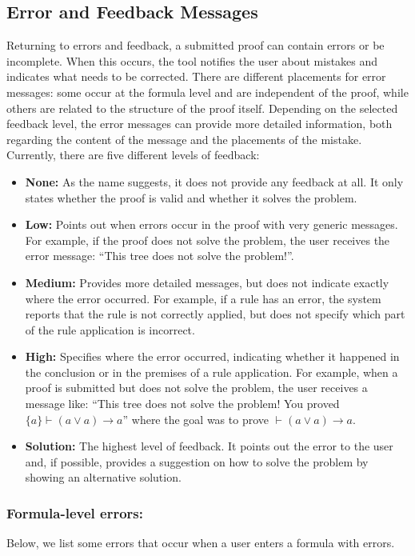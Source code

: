\subsection{Error and Feedback Messages}
Returning to errors and feedback, a submitted proof can contain errors or be incomplete. When this occurs, the tool notifies the user about mistakes and indicates what needs to be corrected. There are different placements for error messages: some occur at the formula level and are independent of the proof, while others are related to the structure of the proof itself. Depending on the selected feedback level, the error messages can provide more detailed information, both regarding the content of the message and the placements of the mistake. Currently, there are five different levels of feedback:  
\begin{itemize}
    \item \textbf{None:} As the name suggests, it does not provide any feedback at all. It only states whether the proof is valid and whether it solves the problem. 
    \item \textbf{Low:} Points out when errors occur in the proof with very generic messages. For example, if the proof does not solve the problem, the user receives the error message: ``This tree does not solve the problem!''.
    \item \textbf{Medium:} Provides more detailed messages, but does not indicate exactly where the error occurred. For example, if a rule has an error, the system reports that the rule is not correctly applied, but does not specify which part of the rule application is incorrect.
    \item \textbf{High:} Specifies where the error occurred, indicating whether it happened in the conclusion or in the premises of a rule application. For example, when a proof is submitted but does not solve the problem, the user receives a message like: ``This tree does not solve the problem! You proved \(\{a\}\vdash (a \lor a) \to a\)'' where the goal was to prove \(\vdash (a \lor a) \to a\).
    \item \textbf{Solution:} The highest level of feedback. It points out the error to the user and, if possible, provides a suggestion on how to solve the problem by showing an alternative solution.
\end{itemize}

\subsubsection*{Formula-level errors:}
Below, we list some errors that occur when a user enters a formula with errors.

